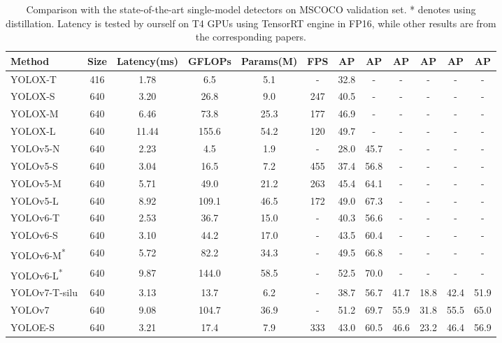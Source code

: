 \documentclass[10pt,twocolumn,letterpaper]{article}
\begin{document}
\begin{table*}[t!]
\begin{center}
\caption{Comparison with the state-of-the-art single-model detectors on MSCOCO validation set. * denotes using distillation. Latency is tested by ourself on T4 GPUs using TensorRT engine in FP16, while other results are from the corresponding papers. }
\label{coco_sota}
\setlength{\tabcolsep}{2pt}
\begin{tabular}{l|c|c|c|c|c|c|  c  c c c c}
\toprule
    Method  & Size & Latency(ms) & GFLOPs & Params(M) & FPS & AP & AP & AP & AP & AP & AP   \\
    \midrule
    YOLOX-T     & 416 & 1.78 & 6.5 & 5.1 & - & 32.8 & - & - & - & - & -    \\ 
    YOLOX-S     & 640 & 3.20 & 26.8 & 9.0 & 247 & 40.5 & - & - & - & - & -    \\ 
    YOLOX-M     & 640 & 6.46 & 73.8 & 25.3 & 177 & 46.9 & - & - & - & - & -    \\ 
    YOLOX-L     & 640 & 11.44 & 155.6 & 54.2 & 120 & 49.7 & - & - & - & - & -    \\ 
    \midrule
    YOLOv5-N     & 640 & 2.23 & 4.5 & 1.9 & - & 28.0 & 45.7 & - & - & - & -    \\ 
    YOLOv5-S     & 640 & 3.04 & 16.5 & 7.2 & 455 & 37.4 & 56.8 & - & - & - & -    \\ 
    YOLOv5-M     & 640 & 5.71 & 49.0 & 21.2 & 263 & 45.4 & 64.1 & - & - & - & -    \\ 
    YOLOv5-L     & 640 & 8.92 & 109.1 & 46.5 & 172 & 49.0 & 67.3 & - & - & - & -    \\ 
    \midrule
    YOLOv6-T     & 640 & 2.53 & 36.7 & 15.0 & - & 40.3 & 56.6 & - & - & - & -    \\ 
    YOLOv6-S     & 640 & 3.10 & 44.2 & 17.0 & - & 43.5 &60.4 & - & - & - & -    \\ 
    YOLOv6-M\textsuperscript{*}  & 640 & 5.72 & 82.2 & 34.3 & - & 49.5 & 66.8 & - & - & - & -    \\ 
    YOLOv6-L\textsuperscript{*} & 640 & 9.87 & 144.0 & 58.5 & - & 52.5 & 70.0 & - & - & - & -    \\ 
    \midrule
    YOLOv7-T-silu & 640 & 3.13 & 13.7 & 6.2 & - & 38.7 & 56.7 & 41.7 & 18.8 & 42.4 & 51.9    \\
    YOLOv7       & 640 & 9.08 & 104.7 & 36.9 & - & 51.2 & 69.7 & 55.9 & 31.8 & 55.5 & 65.0    \\
    \midrule 
    YOLOE-S      & 640 & 3.21 & 17.4 & 7.9 & 333 & 43.0 & 60.5 & 46.6 & 23.2 & 46.4 & 56.9    \\

\end{tabular}
\end{center}
\end{table*}
\end{document}
